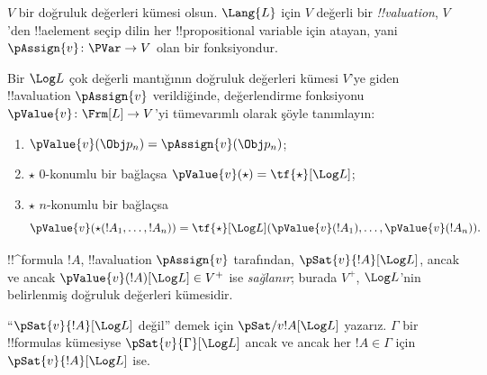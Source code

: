 \documentclass[../../../include/open-logic-section]{subfiles}
\begin{document}


\begin{defn}[!!^{valuation}s] 
$V$ bir doğruluk değerleri kümesi olsun. $\Lang{L}$ için $V$ değerli bir
\emph{!!{valuation}}, $V$'den !!a{element} seçip dilin her
!!{propositional variable} için atayan, yani
$\pAssign{v}\colon\PVar\to V$ olan bir fonksiyondur.
\end{defn}

\begin{defn}
  Bir $\Log L$ çok değerli mantığının doğruluk değerleri kümesi $V$'ye giden
  !!a{valuation} $\pAssign{v}$ verildiğinde, değerlendirme fonksiyonu
  $\pValue{v}\colon\Frm[L]\to V$'yi tümevarımlı olarak şöyle tanımlayın:
  \begin{enumerate}
    \item $\pValue{v}(\Obj p_n) = \pAssign{v}(\Obj p_n)$; 
    \item $\star$ $0$-konumlu bir bağlaçsa
    $\pValue{v}(\star)=\tf{\star}[\Log L]$;
    \item $\star$ $n$-konumlu bir bağlaçsa
    \[
      \pValue{v}(\star(!A_1, \dots, !A_n)) = \tf{\star}[\Log L]
      (\pValue{v}(!A_1), \dots, \pValue{v}(!A_n)).
    \]
  \end{enumerate}
\end{defn}

\begin{defn}[Sağlama]
 !!^{formula} $!A$, !!a{valuation}
  $\pAssign{v}$ tarafından, $\pSat{v}{!A}[\Log L]$, ancak ve ancak
  $\pValue{v}(!A)[\Log L]\in V^+$ ise \emph{sağlanır}; burada $V^+$,
  $\Log L$'nin belirlenmiş doğruluk değerleri kümesidir.
  
  ``$\pSat{v}{!A}[\Log L]$ değil'' demek için
  $\pSat/{v}{!A}[\Log L]$ yazarız. $\Gamma$ bir !!{formula}s kümesiyse
  $\pSat{v}{\Gamma}[\Log L]$ ancak ve ancak her $!A\in\Gamma$ için
  $\pSat{v}{!A}[\Log L]$ ise.
\end{defn}
\end{document}
